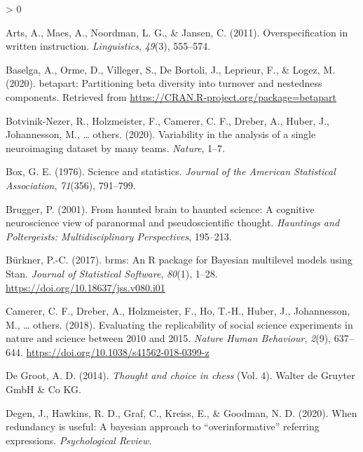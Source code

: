 \documentclass[
  english,
  man,floatsintext]{apa6}
\newlength{\cslhangindent}
\newenvironment{CSLReferences}[2] %
 {%
  \setlength{\parindent}{0pt}
  \ifodd #1 \everypar{\setlength{\hangindent}{\cslhangindent}}\ignorespaces\fi
  \ifnum #2 > 0
  \setlength{\parskip}{#2\baselineskip}
  \fi
 }%
 {}
\begin{document}
\hypertarget{refs}{}
\begin{CSLReferences}{1}{0}
\leavevmode\hypertarget{ref-arts2011overspecification}{}%
Arts, A., Maes, A., Noordman, L. G., \& Jansen, C. (2011). Overspecification in written instruction. \emph{Linguistics}, \emph{49}(3), 555--574.

\leavevmode\hypertarget{ref-baselga2020}{}%
Baselga, A., Orme, D., Villeger, S., De Bortoli, J., Leprieur, F., \& Logez, M. (2020). {b}etapart: Partitioning beta diversity into turnover and nestedness components. Retrieved from \url{https://CRAN.R-project.org/package=betapart}

\leavevmode\hypertarget{ref-botvinik2020variability}{}%
Botvinik-Nezer, R., Holzmeister, F., Camerer, C. F., Dreber, A., Huber, J., Johannesson, M., \ldots{} others. (2020). Variability in the analysis of a single neuroimaging dataset by many teams. \emph{Nature}, 1--7.

\leavevmode\hypertarget{ref-box1976science}{}%
Box, G. E. (1976). Science and statistics. \emph{Journal of the American Statistical Association}, \emph{71}(356), 791--799.

\leavevmode\hypertarget{ref-brugger2001}{}%
Brugger, P. (2001). From haunted brain to haunted science: A cognitive neuroscience view of paranormal and pseudoscientific thought. \emph{Hauntings and Poltergeists: Multidisciplinary Perspectives}, 195--213.

\leavevmode\hypertarget{ref-burkner2017}{}%
Bürkner, P.-C. (2017). {brms}: An {R} package for {Bayesian} multilevel models using {Stan}. \emph{Journal of Statistical Software}, \emph{80}(1), 1--28. \url{https://doi.org/10.18637/jss.v080.i01}

\leavevmode\hypertarget{ref-camerer2018evaluating}{}%
Camerer, C. F., Dreber, A., Holzmeister, F., Ho, T.-H., Huber, J., Johannesson, M., \ldots{} others. (2018). Evaluating the replicability of social science experiments in nature and science between 2010 and 2015. \emph{Nature Human Behaviour}, \emph{2}(9), 637--644. \url{https://doi.org/10.1038/s41562-018-0399-z}

\leavevmode\hypertarget{ref-de2014thought}{}%
De Groot, A. D. (2014). \emph{Thought and choice in chess} (Vol. 4). Walter de Gruyter GmbH \& Co KG.

\leavevmode\hypertarget{ref-degen2020redundancy}{}%
Degen, J., Hawkins, R. D., Graf, C., Kreiss, E., \& Goodman, N. D. (2020). When redundancy is useful: A bayesian approach to {``overinformative''} referring expressions. \emph{Psychological Review}.


\end{CSLReferences}
\end{document}
